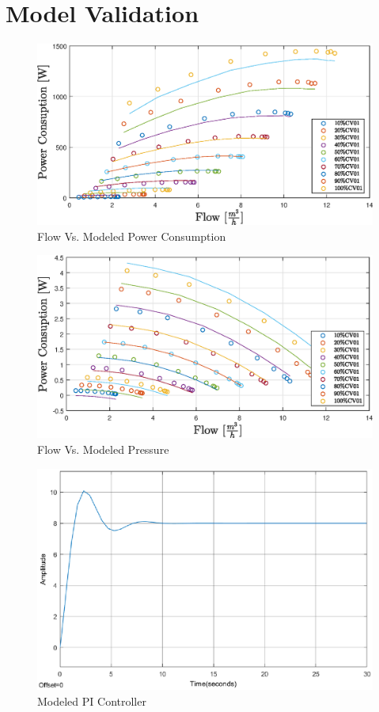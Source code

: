 \chapter{Model Validation}
\label{app:modelValidation}
\begin{figure}[ht]
	\centering
	\includegraphics[width=1\textwidth]{figures/06ModelValidation/flowVsModeledPowerConsumption.eps}
	\caption{Flow Vs. Modeled Power Consumption}
\end{figure}
\begin{figure}[ht]
	\centering
	\includegraphics[width=1\textwidth]{figures/06ModelValidation/flowVsModeledPressure.eps}
	\caption{Flow Vs. Modeled Pressure}
\end{figure}
\begin{figure}[H]
	\centering
	\includegraphics[width=1\textwidth]{figures/06ModelValidation/modelPI.eps}
	\caption{Modeled PI Controller}
\end{figure}

